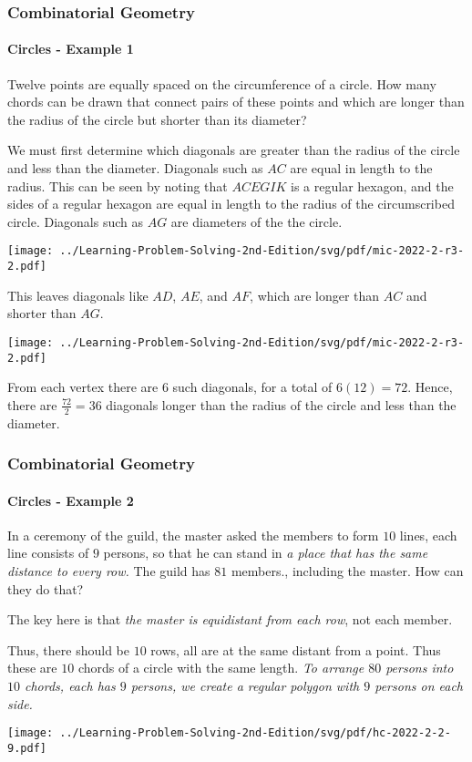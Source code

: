 \documentclass[8pt,xcolor=table,dvipsnames]{beamer}
\begin{document}
\begin{frame}[t]
    \frametitle{Combinatorial Geometry}
    \framesubtitle{Circles - Example 1}
    \begin{example}[MIC-2022-SM2-R3-J2]
        Twelve points are equally spaced on the circumference of a circle.
        How many chords can be drawn that connect pairs of these points
        and which are longer than the radius of the circle but shorter than its diameter?  
    \end{example}
    \begin{overprint}
        We must first determine which diagonals are greater than the radius of the circle and less than the diameter.
        Diagonals such as $AC$ are equal in length to the radius.
        This can be seen by noting that $ACEGIK$ is a regular hexagon,
        and the sides of a regular hexagon are equal in length to the radius of the circumscribed circle.
        Diagonals such as $AG$ are diameters of the the circle.
        \begin{center}
            \texttt{[image: ../Learning-Problem-Solving-2nd-Edition/svg/pdf/mic-2022-2-r3-2.pdf]}
        \end{center}
        This leaves diagonals like $AD$, $AE$, and $AF$, which are longer than $AC$ and shorter than $AG$.
        \begin{center}
            \texttt{[image: ../Learning-Problem-Solving-2nd-Edition/svg/pdf/mic-2022-2-r3-2.pdf]}
        \end{center}
        From each vertex there are $6$ such diagonals, for a total of $6(12)=72$.
        Hence, there are $\frac{72}{2}=\boxed{36}$ diagonals longer than the radius of the circle
        and less than the diameter. 
    \end{overprint}
\end{frame}

\begin{frame}[t]
    \frametitle{Combinatorial Geometry}
    \framesubtitle{Circles - Example 2}
    \begin{example}[HC-2022-SM2-R2-P9]
        In a ceremony of the guild, the master asked the members to form $10$ lines,
        each line consists of $9$ persons, so that he can stand in \textit{a place that has the same distance to every row.}    
        The guild has $81$ members., including the master.
        How can they do that?
    \end{example}
    The key here is that \textit{the master is equidistant from each row}, not each member.
    
    Thus, there should be $10$ rows, all are at the same distant from a point.
    Thus these are $10$ chords of a circle with the same length.
    \textit{To arrange $80$ persons into $10$ chords, each has $9$ persons, 
    we create a regular polygon with $9$ persons on each side.}
    \begin{center}
        \texttt{[image: ../Learning-Problem-Solving-2nd-Edition/svg/pdf/hc-2022-2-2-9.pdf]}
    \end{center}
\end{frame}
\end{document}
